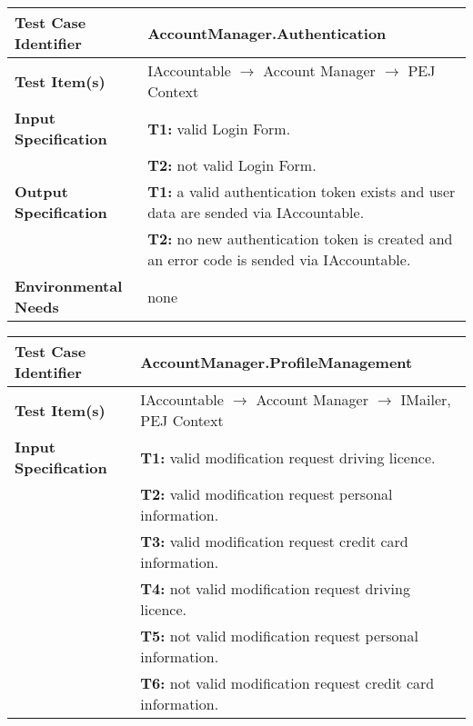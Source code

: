{\noindent 
\begin{tabularx}{\textwidth}{l X}
    \hline 
    \textbf{Test Case Identifier} & AccountManager.Authentication\\ 
    \hline 
    
    \textbf{Test Item(s)} & IAccountable $\rightarrow$ Account Manager $\rightarrow$ PEJ Context\\
    \hline 
    
    \textbf{Input Specification} & \textbf{T1:} valid Login Form.\\
                                &   \textbf{T2:} not valid Login Form.\\
    \hline 
    
    \textbf{Output Specification} & \textbf{T1:} a valid authentication token exists and user data are sended via IAccountable.\\
                                &   \textbf{T2:} no new authentication token is created and an error code is sended via IAccountable.\\
    \hline 
    
    \textbf{Environmental Needs} & none\\
    \hline
\end{tabularx}
\bigskip

\noindent
\begin{tabularx}{\textwidth}{l X}
    \hline 
    \textbf{Test Case Identifier} & AccountManager.ProfileManagement\\ 
    \hline 
    
    \textbf{Test Item(s)} & IAccountable $\rightarrow$ Account Manager $\rightarrow$ IMailer,  PEJ Context\\
    \hline 
    
    \textbf{Input Specification} &  \textbf{T1:} valid modification request driving licence.\\
                                &\textbf{T2:} valid modification request personal information.\\
                                &\textbf{T3:} valid modification request credit card information.\\
                                &  \textbf{T4:} not valid modification request driving licence.\\
                                &\textbf{T5:} not valid modification request personal information.\\
                                &\textbf{T6:} not valid modification request credit card information.\\
    \hline 
    

\end{tabularx}}
